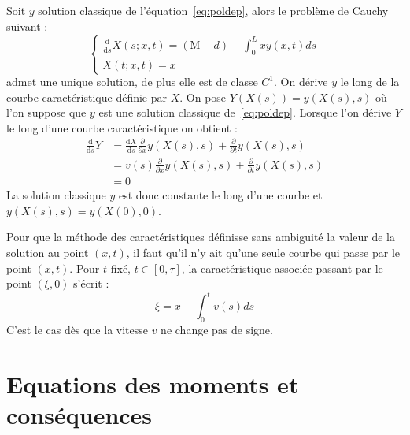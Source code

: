 \documentclass[a4paper]{article}
\newcommand{\mass}{\mathrm{M}}
\newcommand{\dep}{d}
\begin{document}
\begin{preuve}
	Soit $y$ solution classique de l'équation~\eqref{eq:poldep}, 
	alors le problème de Cauchy suivant :
	\[
	\begin{cases}
		\displaystyle \frac{\mathrm{d}}{\mathrm{d}s} X(s;x,t)= (\mass - \dep) - \int_0^L x y(x,t)ds\\
		X(t;x,t) = x
	\end{cases}
	\]
	admet une unique solution, de plus elle est de classe $C^1$.
	On dérive $y$ le long de la courbe caractéristique définie par $X$.
	On pose $Y(X(s))=y(X(s),s)$ où l'on suppose que $y$ est une solution classique de~\eqref{eq:poldep}.
	Lorsque l'on dérive $Y$ le long d'une courbe caractéristique on obtient :
	\[ 
	\begin{split}
		\frac{\mathrm{d}}{\mathrm{d}s} Y & = \frac{\mathrm{d} X }{\mathrm{d}s} \frac{\partial}{\partial x}y(X(s),s) + \frac{\partial}{\partial t}y(X(s),s) \\
		                                 & = v(s) \frac{\partial}{\partial x} y(X(s),s) + \frac{\partial}{\partial t} y(X(s),s)\\
										 & =0 
	\end{split}
		\]
	La solution classique $y$ est donc constante le long d'une courbe et $y(X(s),s) = y(X(0),0)$.
	
\end{preuve}

\begin{remarque}
	Pour que la méthode des caractéristiques définisse sans ambiguité la valeur de la solution au point $(x,t)$, 
	il faut qu'il n'y ait qu'une seule courbe qui passe par le point $(x,t)$.
	Pour $t$ fixé, $t \in [0,\tau]$, la caractéristique associée passant par le point $(\xi,0)$ s'écrit :
	\[ \xi = x - \int_0^t v(s)ds \]
	C'est le cas dès que la vitesse $v$ ne change pas de signe.
\end{remarque}



\section{Equations des moments et conséquences}
\end{document}
